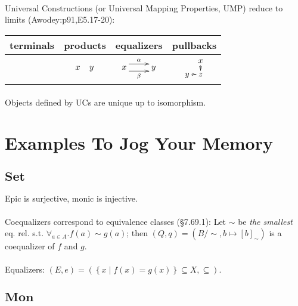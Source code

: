 \documentclass[10pt,twocolumn,letterpaper]{article}
\newcommand{\brak}[1]{\left[{#1}\right]}
\newcommand{\set}[1]{\left\{{#1}\right\}}
\begin{document}
  \paragraph{}
  Universal Constructions (or Universal Mapping Properties, UMP) reduce to
  limits (Awodey:p91,E5.17-20):
  \begin{tabular}{|c|c|c|c|}
  	\hline
      terminals & products & equalizers & pullbacks \\
  	\hline
      & $\xymatrix@C5pt{x & y}$
      & $\xymatrix{x \ar@<1ex>[r]^{\alpha} \ar@<-1ex>[r]_{\beta} & y}$
      & $\xymatrix@C5pt@R5pt{& x \ar[d] \\ y \ar[r] & z}$\\
  	\hline
  \end{tabular}

  \paragraph{}
  Objects defined by UCs are unique up to isomorphism.

\section{Examples To Jog Your Memory}

\subsection{$\mathbf{Set}$}

  \paragraph{} Epic is surjective, monic is injective.

  \paragraph{}
  Coequalizers correspond to equivalence classes (\S7.69.1): Let $\sim$ be
  {\em the smallest} eq. rel. s.t. $\forall_{a \in A} . f(a) \sim g(a)$;
  then $(Q,q) = (B/\sim, b \mapsto \brak{b}_\sim)$ is a coequalizer of $f$
  and $g$.

  \paragraph{}
  Equalizers: $(E,e) = (\set{x \mid f(x) = g(x)} \subseteq X, \subseteq)$.

\subsection{$\mathbf{Mon}$}
\end{document}
